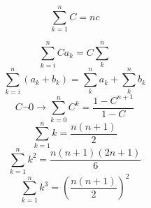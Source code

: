 \begin{tcolorbox}[sharp corners, colback=white,boxrule=1mm]
	\[\sum_{k=1}^n C = nc\]
	
	\[\sum_{k=i}^{n} Ca_k = C \sum_{k}^{n}\]
	\[\sum_{k=i}^{n} (a_k + b_k) = \sum_{k}^{n} a_k + \sum_{k}^{n} b_k\]
	\[C \neg 0 \to \sum_{k=0}^{n} C^k = \frac{1-C^{n+1}}{1-C}\]
	\[\sum_{k=1}^{n} k = \frac{n(n+1)}{2}\]
	\[\sum_{k=1}^{n} k^2 = \frac{n(n+1)(2n+1)}{6}\]
	\[\sum_{k=1}^{n} k^3 = \left (\frac{n(n+1)}{2}  \right )^2\]
\end{tcolorbox}